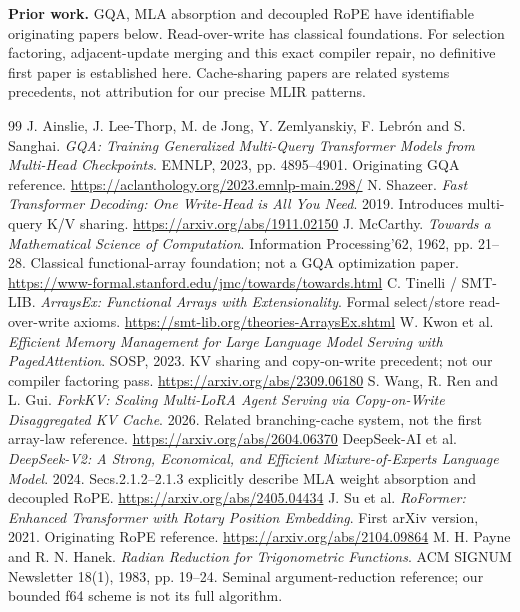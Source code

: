 \documentclass[10pt,a4paper]{article}
\newcommand{\smallnote}[1]{{\footnotesize #1\par}}
\begin{document}
\clearpage
\renewcommand{\refname}{References and attribution}
\smallnote{\textbf{Prior work.} GQA, MLA absorption and decoupled RoPE have identifiable originating papers below. Read-over-write has classical foundations. For selection factoring, adjacent-update merging and this exact compiler repair, no definitive first paper is established here. Cache-sharing papers are related systems precedents, not attribution for our precise MLIR patterns.}
\vspace{3pt}
\begingroup
\normalsize
\setlength{\parskip}{1pt}
\begin{thebibliography}{99}
\setlength{\itemsep}{3pt}
 J. Ainslie, J. Lee-Thorp, M. de Jong, Y. Zemlyanskiy, F. Lebr\'on and S. Sanghai.
\emph{GQA: Training Generalized Multi-Query Transformer Models from Multi-Head Checkpoints}. EMNLP, 2023, pp. 4895--4901. Originating GQA reference.
\url{https://aclanthology.org/2023.emnlp-main.298/}
 N. Shazeer. \emph{Fast Transformer Decoding: One Write-Head is All You Need}. 2019. Introduces multi-query K/V sharing.
\url{https://arxiv.org/abs/1911.02150}
 J. McCarthy. \emph{Towards a Mathematical Science of Computation}. Information Processing'62, 1962, pp. 21--28. Classical functional-array foundation; not a GQA optimization paper.
\url{https://www-formal.stanford.edu/jmc/towards/towards.html}
 C. Tinelli / SMT-LIB. \emph{ArraysEx: Functional Arrays with Extensionality}. Formal select/store read-over-write axioms.
\url{https://smt-lib.org/theories-ArraysEx.shtml}
 W. Kwon et al. \emph{Efficient Memory Management for Large Language Model Serving with PagedAttention}. SOSP, 2023. KV sharing and copy-on-write precedent; not our compiler factoring pass.
\url{https://arxiv.org/abs/2309.06180}
 S. Wang, R. Ren and L. Gui. \emph{ForkKV: Scaling Multi-LoRA Agent Serving via Copy-on-Write Disaggregated KV Cache}. 2026. Related branching-cache system, not the first array-law reference.
\url{https://arxiv.org/abs/2604.06370}
 DeepSeek-AI et al. \emph{DeepSeek-V2: A Strong, Economical, and Efficient Mixture-of-Experts Language Model}. 2024. Secs.2.1.2--2.1.3 explicitly describe MLA weight absorption and decoupled RoPE.
\url{https://arxiv.org/abs/2405.04434}
 J. Su et al. \emph{RoFormer: Enhanced Transformer with Rotary Position Embedding}. First arXiv version, 2021. Originating RoPE reference.
\url{https://arxiv.org/abs/2104.09864}
 M. H. Payne and R. N. Hanek. \emph{Radian Reduction for Trigonometric Functions}. ACM SIGNUM Newsletter 18(1), 1983, pp. 19--24. Seminal argument-reduction reference; our bounded f64 scheme is not its full algorithm.

\end{thebibliography}
\end{document}
